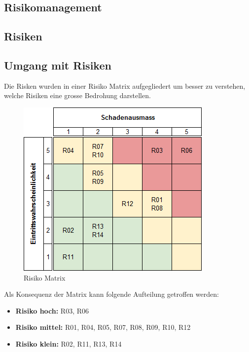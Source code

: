 \newpage


\begin{landscape}
\section{Risikomanagement}
\subsection{Risiken}
\end{landscape}
\subsection{Umgang mit Risiken}
Die Risken wurden in einer Risiko Matrix aufgegliedert um besser zu verstehen, welche Risiken eine grosse Bedrohung darstellen.

\begin{figure}[ht]
	\centering
	\includegraphics[scale=0.7]{images/risk_result.png}
	\caption{Risiko Matrix}
	\label{Risk result}
\end{figure}

Als Konsequenz der Matrix kann folgende Aufteilung getroffen werden:
\begin{itemize}
	\item{\textbf{Risiko hoch:} R03, R06}
	\item{\textbf{Risiko mittel:} R01, R04, R05, R07, R08, R09, R10, R12 }
	\item{\textbf{Risiko klein:} R02, R11, R13, R14}
\end{itemize}

